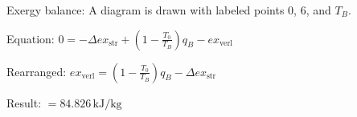 Exergy balance:  
A diagram is drawn with labeled points \( 0 \), \( 6 \), and \( T_B \).  

Equation:  
\( 0 = -\Delta ex_{\text{str}} + \left( 1 - \frac{T_0}{T_B} \right) q_B - ex_{\text{verl}} \)  

Rearranged:  
\( ex_{\text{verl}} = \left( 1 - \frac{T_0}{T_B} \right) q_B - \Delta ex_{\text{str}} \)  

Result:  
\( = 84.826 \, \text{kJ/kg} \)